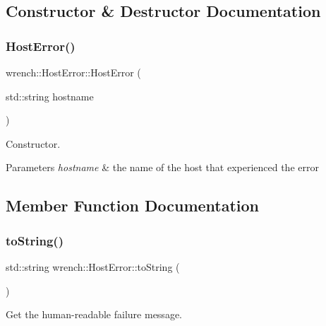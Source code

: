 \subsection{Constructor \& Destructor Documentation}
\mbox{\label{classwrench_1_1_host_error_a9695b613a59279a9e6bc9ea16f673da4}} 
\subsubsection{\texorpdfstring{Host\+Error()}{HostError()}}
{\footnotesize\ttfamily wrench\+::\+Host\+Error\+::\+Host\+Error (\begin{DoxyParamCaption}\item[{std\+::string}]{hostname }\end{DoxyParamCaption})}



Constructor. 


\begin{DoxyParams}{Parameters}
{\em hostname} & the name of the host that experienced the error \\
\hline
\end{DoxyParams}


\subsection{Member Function Documentation}
\mbox{\label{classwrench_1_1_host_error_adacb96198ee8477b67fcac9ff8638266}} 
\subsubsection{\texorpdfstring{to\+String()}{toString()}}
{\footnotesize\ttfamily std\+::string wrench\+::\+Host\+Error\+::to\+String (\begin{DoxyParamCaption}{ }\end{DoxyParamCaption})\hspace{0.3cm}{\ttfamily [virtual]}}



Get the human-\/readable failure message. 

